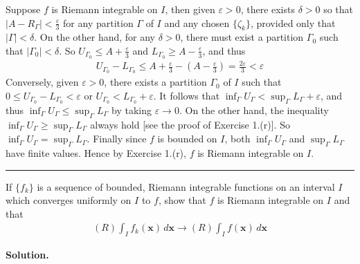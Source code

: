\documentclass[12pt]{article}
\theoremstyle{definition}
\begin{document}
Suppose $f$ is Riemann integrable on $I$, then given $\varepsilon>0$, there exists $\delta>0$ so that $\left\vert A-R_\Gamma\right\vert<\frac{\varepsilon}{3}$ for any partition $\Gamma$ of $I$ and any chosen $\{\zeta_k\}$, provided only that $\left\vert\Gamma\right\vert<\delta$. On the other hand, for any $\delta>0$, there must exist a partition $\Gamma_0$ such that $\left\vert\Gamma_0\right\vert<\delta$. So $U_{\Gamma_0}\le A+\frac{\varepsilon}{3}$ and $L_{\Gamma_0}\ge A-\frac{\varepsilon}{3}$, and thus
\begin{align*}
U_{\Gamma_0}-L_{\Gamma_0}
\le A+\frac{\varepsilon}{3}-\left(A-\frac{\varepsilon}{3}\right)
=\frac{2\varepsilon}{3}
<\varepsilon
\end{align*}
Conversely, given $\varepsilon>0$, there exists a partition $\Gamma_0$ of $I$ such that $0\le U_{\Gamma_0}-L_{\Gamma_0}<\varepsilon$ or $U_{\Gamma_0}<L_{\Gamma_0}+\varepsilon$. It follows that $\inf_{\Gamma}U_\Gamma<\sup_{\Gamma}L_\Gamma+\varepsilon$, and thus $\inf_{\Gamma}U_\Gamma\le\sup_{\Gamma}L_\Gamma$ by taking $\varepsilon\to 0$. On the other hand, the inequality $\inf_{\Gamma}U_\Gamma\ge\sup_{\Gamma}L_\Gamma$ always hold [see the proof of Exercise 1.(r)]. So $\inf_{\Gamma}U_\Gamma=\sup_{\Gamma}L_\Gamma$. Finally since $f$ is bounded on $I$, both $\inf_{\Gamma}U_\Gamma$ and $\sup_{\Gamma}L_\Gamma$ have finite values. Hence by Exercise 1.(r), $f$ is Riemann integrable on $I$.



\bigskip\noindent\hrule\bigskip

If $\{f_k\}$ is a sequence of bounded, Riemann integrable functions on an interval $I$ which converges uniformly on $I$ to $f$, show that $f$ is Riemann integrable on $I$ and that
\begin{align*}
(R)\int_If_k(\mathbf{x})\,d\mathbf{x}\to(R)\int_If(\mathbf{x})\,d\mathbf{x}
\end{align*}

\smallskip
\noindent\textbf{Solution.}\quad
\end{document}
